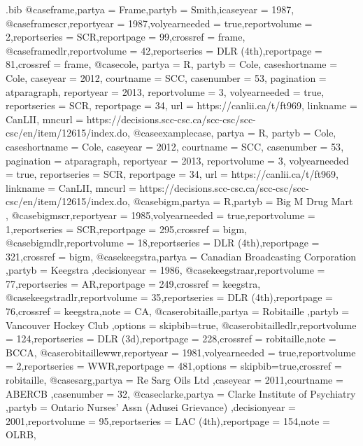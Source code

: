 \begin{filecontents*}[overwrite]{\jobname.bib}
@case{frame,partya = {Frame},partyb = {Smith},icaseyear = {1987},}
@case{framescr,reportyear = {1987},volyearneeded = {true},reportvolume = {2},reportseries = {SCR},reportpage = {99},crossref = {frame},}
@case{framedlr,reportvolume = {42},reportseries = {DLR (4th)},reportpage = {81},crossref = {frame},}
@case{cole,	partya =  {R},	partyb =  {Cole},	caseshortname =  {Cole},	caseyear =  {2012},	courtname =  {SCC},	casenumber =  {53},	pagination =  {atparagraph},	reportyear =  {2013},	reportvolume =  {3},	volyearneeded =  {true},	reportseries =  {SCR},	reportpage =  {34},	url =  {https://canlii.ca/t/ft969},	linkname =  {CanLII},	mncurl =  {https://decisions.scc-csc.ca/scc-csc/scc-csc/en/item/12615/index.do},					}
@case{examplecase,	partya =  {R},	partyb =  {Cole},	caseshortname =  {Cole},	caseyear =  {2012},	courtname =  {SCC},	casenumber =  {53},	pagination =  {atparagraph},	reportyear =  {2013},	reportvolume =  {3},	volyearneeded =  {true},	reportseries =  {SCR},	reportpage =  {34},	url =  {https://canlii.ca/t/ft969},	linkname =  {CanLII},	mncurl =  {https://decisions.scc-csc.ca/scc-csc/scc-csc/en/item/12615/index.do},					}
@case{bigm,partya = {R},partyb = {Big M Drug Mart },}
@case{bigmscr,reportyear = {1985},volyearneeded = {true},reportvolume = {1},reportseries = {SCR},reportpage = {295},crossref = {bigm},}
@case{bigmdlr,reportvolume = {18},reportseries = {DLR (4th)},reportpage = {321},crossref = {bigm},}
@case{keegstra,partya = {Canadian Broadcasting Corporation },partyb = {Keegstra },decisionyear = {1986},}
@case{keegstraar,reportvolume = {77},reportseries = {AR},reportpage = {249},crossref = {keegstra},}
@case{keegstradlr,reportvolume = {35},reportseries = {DLR (4th)},reportpage = {76},crossref = {keegstra},note = {CA},}
@case{robitaille,partya = {Robitaille },partyb = {Vancouver Hockey Club },options = {skipbib=true},}
@case{robitailledlr,reportvolume = {124},reportseries = {DLR (3d)},reportpage = {228},crossref = {robitaille},note = {BCCA},}
@case{robitaillewwr,reportyear = {1981},volyearneeded = {true},reportvolume = {2},reportseries = {WWR},reportpage = {481},options = {skipbib=true},crossref = {robitaille},}
@case{sarg,partya = {Re Sarg Oils Ltd },caseyear = {2011},courtname = {ABERCB },casenumber = {32},}
@case{clarke,partya = {Clarke Institute of Psychiatry },partyb = {Ontario Nurses' Assn (Adusei Grievance) },decisionyear = {2001},reportvolume = {95},reportseries = {LAC (4th)},reportpage = {154},note = {OLRB},}

\end{filecontents*}
